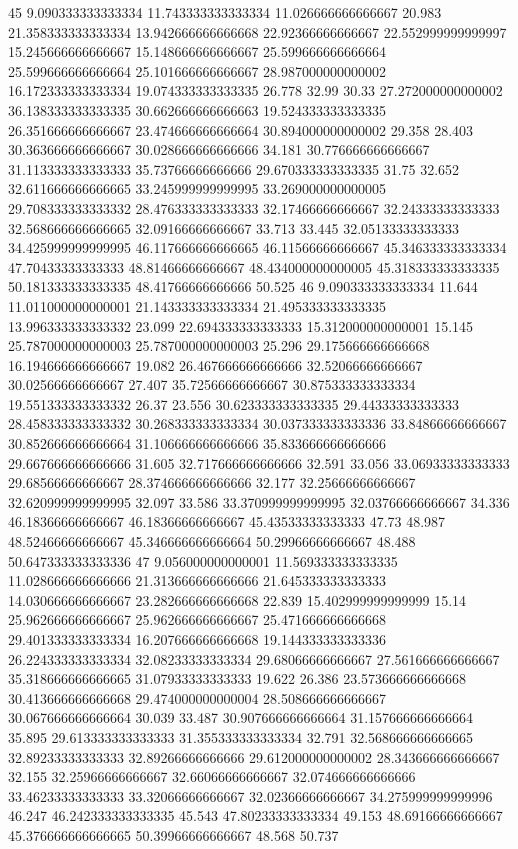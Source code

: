 45 9.090333333333334 11.743333333333334 11.026666666666667 20.983 21.358333333333334 13.942666666666668 22.92366666666667 22.552999999999997 15.245666666666667 15.148666666666667 25.599666666666664 25.599666666666664 25.101666666666667 28.987000000000002 16.172333333333334 19.074333333333335 26.778 32.99 30.33 27.272000000000002 36.138333333333335 30.662666666666663 19.524333333333335 26.351666666666667 23.474666666666664 30.894000000000002 29.358 28.403 30.363666666666667 30.028666666666666 34.181 30.776666666666667 31.113333333333333 35.73766666666666 29.670333333333335 31.75 32.652 32.611666666666665 33.245999999999995 33.269000000000005 29.708333333333332 28.476333333333333 32.17466666666667 32.24333333333333 32.568666666666665 32.09166666666667 33.713 33.445 32.05133333333333 34.425999999999995 46.117666666666665 46.11566666666667 45.346333333333334 47.70433333333333 48.81466666666667 48.434000000000005 45.318333333333335 50.181333333333335 48.41766666666666 50.525
46 9.090333333333334 11.644 11.011000000000001 21.143333333333334 21.495333333333335 13.996333333333332 23.099 22.694333333333333 15.312000000000001 15.145 25.787000000000003 25.787000000000003 25.296 29.175666666666668 16.194666666666667 19.082 26.467666666666666 32.52066666666667 30.02566666666667 27.407 35.72566666666667 30.875333333333334 19.551333333333332 26.37 23.556 30.623333333333335 29.44333333333333 28.458333333333332 30.268333333333334 30.037333333333336 33.84866666666667 30.852666666666664 31.106666666666666 35.833666666666666 29.667666666666666 31.605 32.717666666666666 32.591 33.056 33.06933333333333 29.68566666666667 28.374666666666666 32.177 32.25666666666667 32.620999999999995 32.097 33.586 33.370999999999995 32.03766666666667 34.336 46.18366666666667 46.18366666666667 45.43533333333333 47.73 48.987 48.52466666666667 45.346666666666664 50.29966666666667 48.488 50.647333333333336
47 9.056000000000001 11.569333333333335 11.028666666666666 21.313666666666666 21.645333333333333 14.030666666666667 23.282666666666668 22.839 15.402999999999999 15.14 25.962666666666667 25.962666666666667 25.471666666666668 29.401333333333334 16.207666666666668 19.144333333333336 26.224333333333334 32.08233333333334 29.68066666666667 27.561666666666667 35.318666666666665 31.07933333333333 19.622 26.386 23.573666666666668 30.413666666666668 29.474000000000004 28.508666666666667 30.067666666666664 30.039 33.487 30.907666666666664 31.157666666666664 35.895 29.613333333333333 31.355333333333334 32.791 32.568666666666665 32.89233333333333 32.89266666666666 29.612000000000002 28.343666666666667 32.155 32.25966666666667 32.66066666666667 32.074666666666666 33.46233333333333 33.32066666666667 32.02366666666667 34.275999999999996 46.247 46.242333333333335 45.543 47.80233333333334 49.153 48.69166666666667 45.376666666666665 50.39966666666667 48.568 50.737
